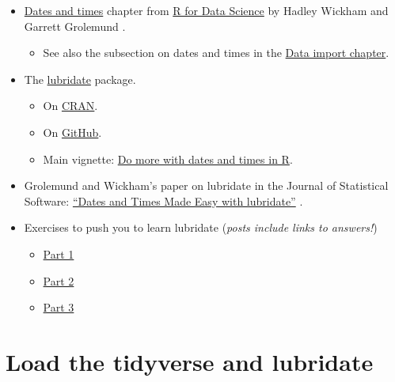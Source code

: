 \documentclass[
]{book}
\providecommand{\tightlist}{%
  \setlength{\itemsep}{0pt}\setlength{\parskip}{0pt}}
\begin{document}
\begin{itemize}
\tightlist
\item
  \href{https://r4ds.had.co.nz/dates-and-times.html}{Dates and times} chapter from \href{https://r4ds.had.co.nz}{R for Data Science} by Hadley Wickham and Garrett Grolemund \citeyearpar{wickham2016}.

  \begin{itemize}
  \tightlist
  \item
    See also the subsection on dates and times in the \href{http://r4ds.had.co.nz/data-import.html}{Data import chapter}.
  \end{itemize}
\item
  The \href{https://lubridate.tidyverse.org}{lubridate} package.

  \begin{itemize}
  \tightlist
  \item
    On \href{https://cloud.R-project.org/package=lubridate}{CRAN}.
  \item
    On \href{https://github.com/tidyverse/lubridate}{GitHub}.
  \item
    Main vignette: \href{https://lubridate.tidyverse.org/articles/lubridate.html}{Do more with dates and times in R}.
  \end{itemize}
\item
  Grolemund and Wickham's paper on lubridate in the Journal of Statistical Software: \href{https://www.jstatsoft.org/article/view/v040i03}{``Dates and Times Made Easy with lubridate''} \citeyearpar{grolemund2011}.
\item
  Exercises to push you to learn lubridate (\emph{posts include links to answers!})

  \begin{itemize}
  \tightlist
  \item
    \href{https://www.r-exercises.com/2016/08/15/dates-and-times-simple-and-easy-with-lubridate-part-1/}{Part 1}
  \item
    \href{https://www.r-exercises.com/2016/08/29/dates-and-times-simple-and-easy-with-lubridate-exercises-part-2/}{Part 2}
  \item
    \href{https://www.r-exercises.com/2016/10/04/dates-and-times-simple-and-easy-with-lubridate-exercises-part-3/}{Part 3}
  \end{itemize}
\end{itemize}

\hypertarget{load-the-tidyverse-and-lubridate}{%
\section{Load the tidyverse and lubridate}\label{load-the-tidyverse-and-lubridate}}
\end{document}
